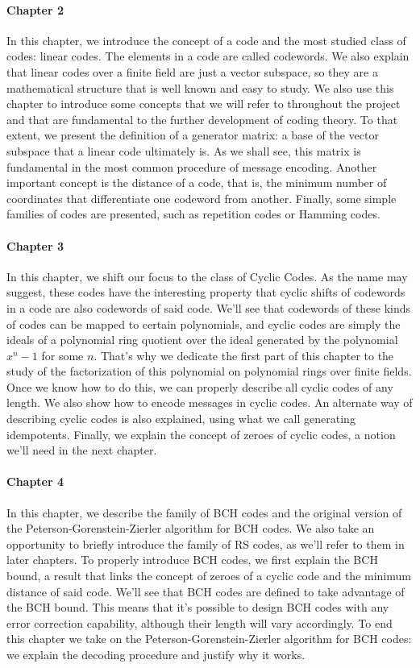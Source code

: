 \paragraph{Chapter 2} In this chapter, we introduce the concept of a code and the most studied class of codes: linear codes.
The elements in a code are called codewords.
We also explain that linear codes over a finite field are just a vector subspace, so they are a mathematical structure that is well known and easy to study.
We also use this chapter to introduce some concepts that we will refer to throughout the project and that are fundamental to the further development of coding theory.
To that extent, we present the definition of a generator matrix: a base of the vector subspace that a linear code ultimately is.
As we shall see, this matrix is fundamental in the most common procedure of message encoding.
Another important concept is the distance of a code, that is, the minimum number of coordinates that differentiate one codeword from another.
Finally, some simple families of codes are presented, such as repetition codes or Hamming codes.

\paragraph{Chapter 3} In this chapter, we shift our focus to the class of Cyclic Codes. 
As the name may suggest, these codes have the interesting property that cyclic shifts of codewords in a code are also codewords of said code.
We'll see that codewords of these kinds of codes can be mapped to certain polynomials, and cyclic codes are simply the ideals of a polynomial ring quotient over the ideal generated by the polynomial \(x^n - 1\) for some \(n\).
That's why we dedicate the first part of this chapter to the study of the factorization of this polynomial on polynomial rings over finite fields.
Once we know how to do this, we can properly describe all cyclic codes of any length.
We also show how to encode messages in cyclic codes.
An alternate way of describing cyclic codes is also explained, using what we call generating idempotents.
Finally, we explain the concept of zeroes of cyclic codes, a notion we'll need in the next chapter.

\paragraph{Chapter 4} In this chapter, we describe the family of BCH codes and the original version of the Peterson-Gorenstein-Zierler algorithm for BCH codes.
We also take an opportunity to briefly introduce the family of RS codes, as we'll refer to them in later chapters.
To properly introduce BCH codes, we first explain the BCH bound, a result that links the concept of zeroes of a cyclic code and the minimum distance of said code.
We'll see that BCH codes are defined to take advantage of the BCH bound.
This means that it's possible to design BCH codes with any error correction capability, although their length will vary accordingly.
To end this chapter we take on the Peterson-Gorenstein-Zierler algorithm for BCH codes: we explain the decoding procedure and justify why it works.

